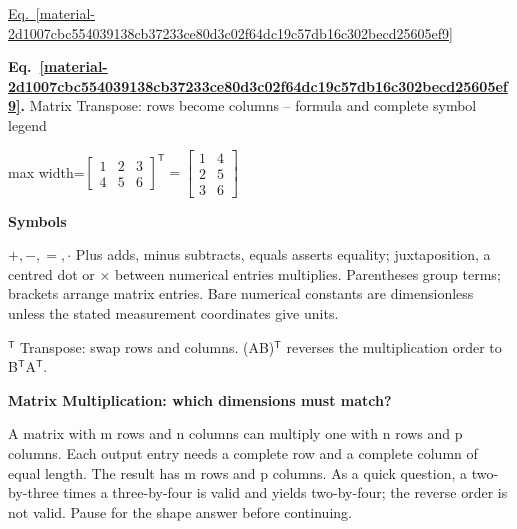 \documentclass[11pt,a4paper]{article}
\begin{document}
\hyperref[material-2d1007cbc554039138cb37233ce80d3c02f64dc19c57db16c302becd25605ef9]{Eq.~\ref*{material-2d1007cbc554039138cb37233ce80d3c02f64dc19c57db16c302becd25605ef9}}


\par\medskip
\noindent\begin{minipage}{\linewidth}
\label{material-2d1007cbc554039138cb37233ce80d3c02f64dc19c57db16c302becd25605ef9}
\noindent\textbf{Eq.~\ref*{material-2d1007cbc554039138cb37233ce80d3c02f64dc19c57db16c302becd25605ef9}.} Matrix Transpose: rows become columns – formula and complete symbol legend\par\nopagebreak
\begin{center}\begin{adjustbox}{max width=\linewidth}$\displaystyle \begin{bmatrix}\boxed{1}&\boxed{2}&\boxed{3}\\4&5&6\end{bmatrix}^{\mathsf T}=\begin{bmatrix}\boxed{1}&4\\\boxed{2}&5\\\boxed{3}&6\end{bmatrix}$\end{adjustbox}\end{center}

\par\noindent\textbf{Symbols}

\par\noindent\textbf{\(+,-,=,\cdot\)} Plus adds, minus subtracts, equals asserts equality; juxtaposition, a centred dot or \ensuremath{\times} between numerical entries multiplies. Parentheses group terms; brackets arrange matrix entries. Bare numerical constants are dimensionless unless the stated measurement coordinates give units.

\par\noindent\textbf{\({}^{\mathsf T}\)} Transpose: swap rows and columns. (AB)\ensuremath{{}^{\mathsf T}} reverses the multiplication order to B\ensuremath{{}^{\mathsf T}}A\ensuremath{{}^{\mathsf T}}.

\end{minipage}\par
\medskip

\textbf{Matrix Multiplication: which dimensions must match?}


A matrix with m rows and n columns can multiply one with n rows and p columns. Each output entry needs a complete row and a complete column of equal length. The result has m rows and p columns. As a quick question, a two-by-three times a three-by-four is valid and yields two-by-four; the reverse order is not valid. Pause for the shape answer before continuing.
\end{document}
